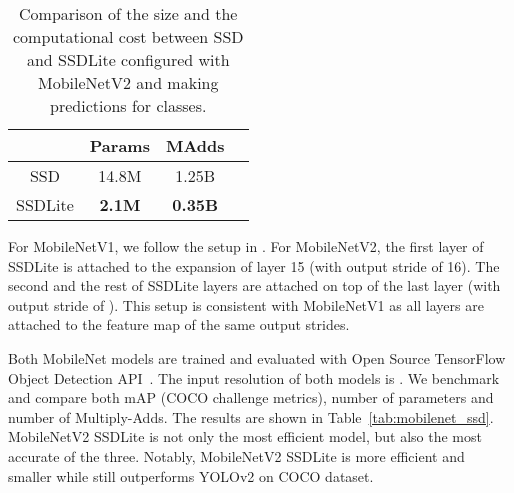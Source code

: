\documentclass[10pt,twocolumn,letterpaper]{article}
\begin{document}
\begin{table}[!t]
  \centering
  \begin{tabular}{c | c c c}
  \toprule[0.2em]
   & Params & MAdds \\
  \toprule[0.2em]
  SSD\cite{liu2016ssd} & 14.8M &  1.25B  \\
  SSDLite & \textbf{2.1M} & \textbf{0.35B}  \\
  \toprule[0.2em]
  \end{tabular}
  \caption{
    Comparison of the size and the computational cost between SSD and SSDLite configured with \mbox{MobileNetV2} and making predictions for  classes.}
  \label{tab:ssd_lite}
\end{table}

For \mbox{MobileNetV1}, we follow the setup in \cite{huang2016speed}.
For \mbox{MobileNetV2}, the first layer of SSDLite is attached to the  expansion of layer 15 (with output stride of 16). The second and the rest of SSDLite layers are attached on top of the last layer (with output stride of ). This setup is consistent with \mbox{MobileNetV1} as all  layers are attached to the  feature map of the same output strides.

Both \mbox{MobileNet} models are trained and evaluated with Open Source TensorFlow Object Detection API~\cite{detection-api}.
The input resolution of both models is .
We benchmark and compare both mAP (COCO challenge metrics), number of parameters and number of Multiply-Adds.
The results are shown in Table~\ref{tab:mobilenet_ssd}.
\mbox{MobileNetV2} SSDLite is not only the most efficient model, but also the most accurate of the three.
Notably, \mbox{MobileNetV2} SSDLite is \textbf{} more efficient and \textbf{} smaller while still outperforms YOLOv2 on COCO dataset.
\end{document}
